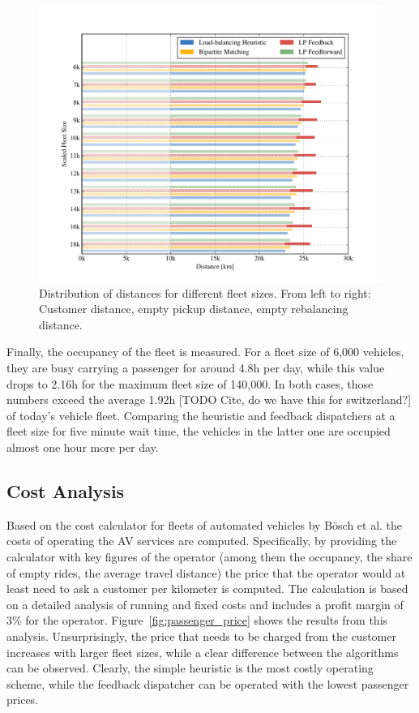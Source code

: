 \begin{figure}
\includegraphics[width=1.0\textwidth]{figures/distances.pdf}
\caption{Distribution of distances for different fleet sizes. From left to right:
Customer distance, empty pickup distance, empty rebalancing distance.}
\label{fig:distances}
\end{figure}

Finally, the occupancy of the fleet is measured. For a fleet size of 6,000
vehicles, they are busy carrying a passenger for around 4.8h per day, while
this value drops to 2.16h for the maximum fleet size of 140,000. In both cases,
those numbers exceed the average 1.92h [TODO Cite, do we have this for switzerland?] of today's vehicle fleet.
Comparing the heuristic and feedback dispatchers at a fleet size for five minute
wait time, the vehicles in the latter one are occupied almost one hour more per day.

\subsection{Cost Analysis}
\label{sec:cost_analysis}

Based on the cost calculator for fleets of automated vehicles by Bösch et al. \cite{Bosch2016a}
 the costs of operating the AV services are computed. Specifically, by providing the calculator with key
figures of the operator (among them the occupancy, the share of empty rides, the
average travel distance) the price that the operator would at least need to ask
a customer per kilometer is computed. The calculation
is based on a detailed analysis of running and fixed costs and includes a
profit margin of 3\% for the operator. Figure~\ref{fig:passenger_price}
shows the results from this analysis. Unsurprisingly, the price that needs to be
charged from the customer increases with larger fleet sizes, while a clear difference
between the algorithms can be observed. Clearly, the simple heuristic is the most
costly operating scheme, while the feedback dispatcher can be operated with the
lowest passenger prices.


